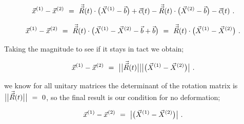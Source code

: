 \documentclass{article}
\begin{document}
\begin{equation} \label{eb-eq-1-38}
\vec{x}^{(1)} - \vec{x}^{(2)} \hspace{0.125cm} = \hspace{0.125cm} \vec{\vec{R}}(t) \cdot \big( \vec{X}^{(1)} - \vec{b} \big) +  \vec{c}(t) - \vec{\vec{R}}(t) \cdot \big( \vec{X}^{(2)} - \vec{b} \big) - \vec{c}(t) \hspace{0.125cm} .
\end{equation}

\begin{equation} \label{eb-eq-1-39}
\vec{x}^{(1)} - \vec{x}^{(2)} \hspace{0.125cm} = \hspace{0.125cm} \vec{\vec{R}}(t) \cdot \big( \vec{X}^{(1)} - \vec{X}^{(2)} - \vec{b} + \vec{b} \big)  \hspace{0.125cm} = \hspace{0.125cm} \vec{\vec{R}}(t) \cdot \big( \vec{X}^{(1)} - \vec{X}^{(2)} \big) \hspace{0.125cm} .
\end{equation}

Taking the magnitude to see if it stays in tact we obtain;

\begin{equation} \label{eb-eq-1-40}
\vec{x}^{(1)} - \vec{x}^{(2)} \hspace{0.125cm} = \hspace{0.125cm} \big|\big| \vec{\vec{R}}(t) \big|\big|  \big| \big( \vec{X}^{(1)} - \vec{X}^{(2)} \big) \big| \hspace{0.125cm} .
\end{equation}

we know for all unitary matrices the determinant of the rotation matrix is \begin{math} \big|\big| \vec{\vec{R}}(t) \big|\big| \hspace{0.125cm} = \hspace{0.125cm} 0 \end{math}, so the final result is our condition for no deformation;

\begin{equation} \label{eb-eq-1-41}
\vec{x}^{(1)} - \vec{x}^{(2)} \hspace{0.125cm} = \hspace{0.125cm} \big| \big( \vec{X}^{(1)} - \vec{X}^{(2)} \big) \big| \hspace{0.125cm} .
\end{equation}
\end{document}
